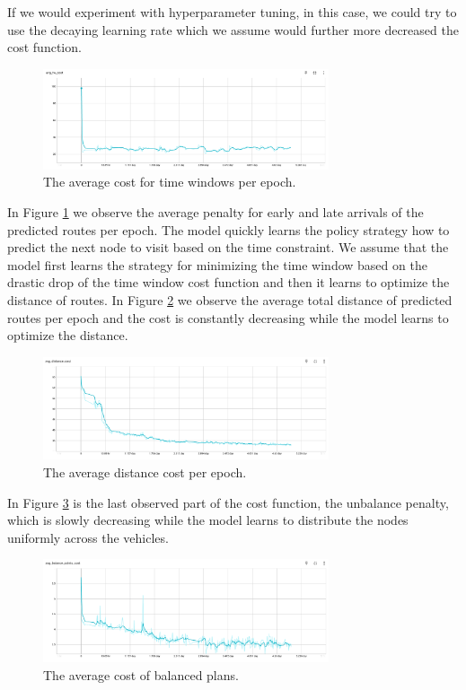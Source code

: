 If we would experiment with hyperparameter tuning, in this case, we could try to use the decaying learning rate which we assume would further more decreased the cost function.

\begin{figure}[ht]
    \centering
    \includegraphics[width=0.75\textwidth]{resources/evaluation/avg-tw-cost.png}
    \caption{The average cost for time windows per epoch.}
    \label{fig:avg-cost-tw}
\end{figure}

In Figure \ref{fig:avg-cost-tw} we observe the average penalty for early and late arrivals of the predicted routes per epoch. The model quickly learns the policy strategy how to predict the next node to visit based on the time constraint. We assume that the model first learns the strategy for minimizing the time window based on the drastic drop of the time window cost function and then it learns to optimize the distance of routes. In Figure \ref{fig:avg-cost-distance} we observe the average total distance of predicted routes per epoch and the cost is constantly decreasing while the model learns to optimize the distance.

\begin{figure}[ht]
    \centering
    \includegraphics[width=0.75\textwidth]{resources/evaluation/avg-distance-cost.png}
    \caption{The average distance cost per epoch.}
    \label{fig:avg-cost-distance}
\end{figure}

In Figure \ref{fig:avg-cost-balance} is the last observed part of the cost function, the unbalance penalty, which is slowly decreasing while the model learns to distribute the nodes uniformly across the vehicles.

\begin{figure}[ht]
    \centering
    \includegraphics[width=0.75\textwidth]{resources/evaluation/avg-balance-cost.png}
    \caption{The average cost of balanced plans.}
    \label{fig:avg-cost-balance}
\end{figure}

